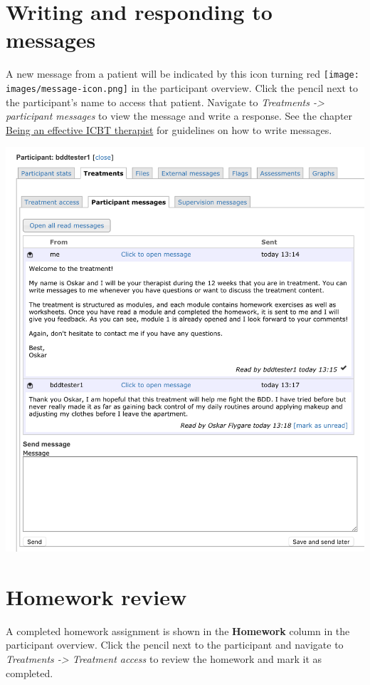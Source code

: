 \documentclass[]{book}
\theoremstyle{definition}
\theoremstyle{definition}
\theoremstyle{definition}
\theoremstyle{remark}
\begin{document}
\hypertarget{writing-and-responding-to-messages}{%
\section{Writing and responding to
messages}\label{writing-and-responding-to-messages}}

A new message from a patient will be indicated by this icon turning red
\texttt{[image: images/message-icon.png]} in the participant overview.
Click the pencil next to the participant's name to access that patient.
Navigate to \emph{Treatments -\textgreater{} participant messages} to
view the message and write a response. See the chapter
\protect\hyperlink{being-an-effective-icbt-therapist}{Being an effective
ICBT therapist} for guidelines on how to write messages.

\includegraphics{images/therapist-messages.png}

\hypertarget{homework-review}{%
\section{Homework review}\label{homework-review}}

A completed homework assignment is shown in the \textbf{Homework} column
in the participant overview. Click the pencil next to the participant
and navigate to \emph{Treatments -\textgreater{} Treatment access} to
review the homework and mark it as completed.
\end{document}
